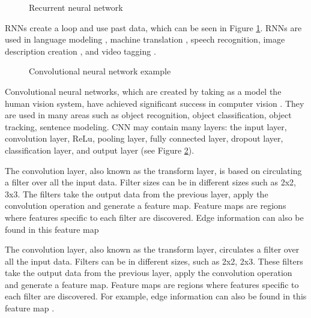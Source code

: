\begin{figure}[htbp]
\centering
{}
\caption{Recurrent neural network \cite{quiza2009computational}}
\label{fig:MethodologyRecurrentNeuralNetwork}
\end{figure}

RNNs create a loop and use past data, which can be seen in Figure \ref{fig:MethodologyRecurrentNeuralNetwork}. RNNs are used in language modeling \cite{mikolov2011extensions}, machine translation \cite{cho2014learning}, speech recognition\cite{miao2015eesen}, image description creation \cite{mao2014deep}, and video tagging \cite{garg2021video}. 

\begin{figure}[htbp]
\centering
{}
\caption{Convolutional neural network example \cite{ferracuti2019business}}
\label{fig:MethodologyConvolutionalNeuralNetworkExample}
\end{figure}

Convolutional neural networks, which are created by taking as a model the human vision system, have achieved significant success in computer vision \cite{gu2018recent, bouvrie2006notes, lavin2016fast}. They are used in many areas such as object recognition, object classification, object tracking, sentence modeling. CNN may contain many layers: the input layer, convolution layer, ReLu, pooling layer, fully connected layer, dropout layer, classification layer, and output layer (see Figure \ref{fig:MethodologyConvolutionalNeuralNetworkExample}).

The convolution layer, also known as the transform layer, is based on circulating a filter over all the input data. Filter sizes can be in different sizes such as 2x2, 3x3. The filters take the output data from the previous layer, apply the convolution operation and generate a feature map. Feature maps are regions where features specific to each filter are discovered. Edge information can also be found in this feature map \cite{goodfellow2016deep}

The convolution layer, also known as the transform layer, circulates a filter over all the input data. Filters can be in different sizes, such as 2x2, 2x3. These filters take the output data from the previous layer, apply the convolution operation and generate a feature map. Feature maps are regions where features specific to each filter are discovered. For example, edge information can also be found in this feature map \cite{goodfellow2016deep}.

